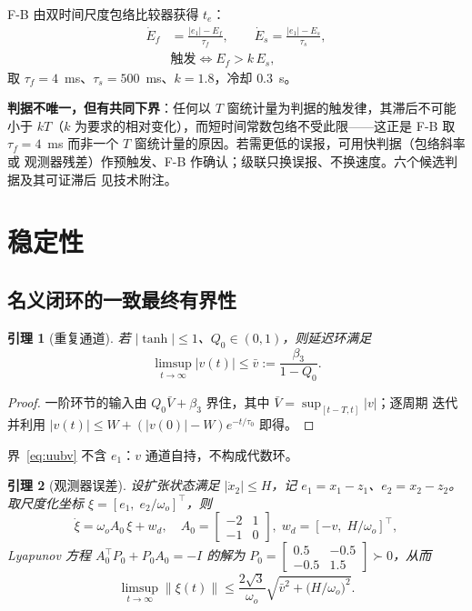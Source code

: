 \documentclass[journal]{IEEEtran}
\newtheorem{lemma}{引理}
\theoremstyle{remark}
\newcommand{\st}{\operatorname{tanh}}
\begin{document}
F-B 由双时间尺度包络比较器获得 $t_e$：
\begin{equation}
\begin{aligned}
\dot E_f&=\frac{|e_1|-E_f}{\tau_f},\qquad \dot E_s=\frac{|e_1|-E_s}{\tau_s},\\
&\text{触发}\iff E_f>k\,E_s ,
\end{aligned}
\label{eq:envelope}
\end{equation}
取 $\tau_f=4$~ms、$\tau_s=500$~ms、$k=1.8$，冷却 $0.3$~s。

\textbf{判据不唯一，但有共同下界}：任何以 $T$ 窗统计量为判据的触发律，其滞后不可能
小于 $kT$（$k$ 为要求的相对变化），而短时间常数包络不受此限——这正是 F-B 取
$\tau_f=4$~ms 而非一个 $T$ 窗统计量的原因。若需更低的误报，可用快判据（包络斜率或
观测器残差）作预触发、F-B 作确认；级联只换误报、不换速度。六个候选判据及其可证滞后
见技术附注。

\section{稳定性}\label{sec:stab}
\subsection{名义闭环的一致最终有界性}
\begin{lemma}[重复通道]\label{lem:v}
若 $|\st|\le1$、$Q_0\in(0,1)$，则延迟环满足
\begin{equation}
\limsup_{t\to\infty}|v(t)|\le\bar v:=\frac{\beta_3}{1-Q_0}.
\label{eq:uubv}
\end{equation}
\end{lemma}
\begin{proof}
一阶环节的输入由 $Q_0\bar V+\beta_3$ 界住，其中 $\bar V=\sup_{[t-T,t]}|v|$；逐周期
迭代并利用 $|v(t)|\le W+(|v(0)|-W)e^{-t/\tau_0}$ 即得。
\end{proof}
界~\eqref{eq:uubv} 不含 $e_1$：$v$ 通道自持，不构成代数环。

\begin{lemma}[观测器误差]\label{lem:eso}
设扩张状态满足 $|\dot x_2|\le H$，记 $e_1=x_1-z_1$、$e_2=x_2-z_2$。取尺度化坐标
$\xi=[e_1,\;e_2/\omega_o]^{\!\top}$，则
\begin{equation}
\dot\xi=\omega_o A_0\,\xi+w_d,\quad
A_0=\begin{bmatrix}-2&1\\-1&0\end{bmatrix},\;
w_d=[-v,\;H/\omega_o]^{\!\top},
\label{eq:esiso}
\end{equation}
Lyapunov 方程 $A_0^{\!\top}P_0+P_0A_0=-I$ 的解为
$P_0=\begin{bmatrix}0.5&-0.5\\-0.5&1.5\end{bmatrix}\succ0$，从而
\begin{equation}
\limsup_{t\to\infty}\|\xi(t)\|\le\frac{2\sqrt3}{\omega_o}
\sqrt{\bar v^{2}+\big(H/\omega_o\big)^{2}} .
\label{eq:uubeso}
\end{equation}
\end{lemma}
\end{document}
